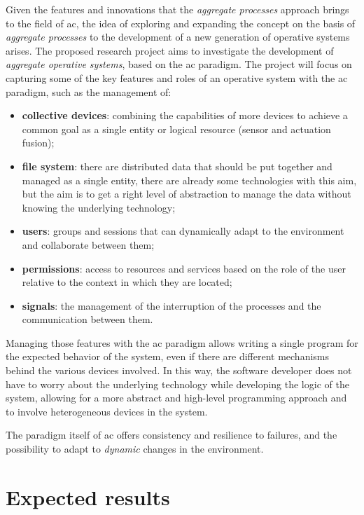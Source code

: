 \documentclass[12pt, a4paper]{article}
\begin{document}
Given the features and innovations that the \emph{aggregate processes} approach brings to the field of \ac{ac},
the idea of exploring and expanding the concept on the basis of \emph{aggregate processes} to the development
of a new generation of operative systems arises.
%
The proposed research project aims to investigate the development of \emph{aggregate operative systems},
based on the \ac{ac} paradigm.
%
The project will focus on capturing some of the key features and roles of an operative system with the \ac{ac} paradigm,
such as the management of:
\begin{itemize}
    \item \textbf{collective devices}: combining the capabilities of more devices to achieve a common goal as a single
        entity or logical resource (sensor and actuation fusion);
    \item \textbf{file system}: there are distributed data that should be put together and managed as a single entity,
        there are already some technologies with this aim, but the aim is to get a right level of abstraction to manage the data
        without knowing the underlying technology;
    \item \textbf{users}: groups and sessions that can dynamically adapt to the environment and collaborate between them;
    \item \textbf{permissions}: access to resources and services based on the role of the user relative to the context in which they are located;
    \item \textbf{signals}: the management of the interruption of the processes and the communication between them.
\end{itemize}

Managing those features with the \ac{ac} paradigm allows writing a single program for the expected behavior of the system,
even if there are different mechanisms behind the various devices involved.
%
In this way,
the software developer does not have to worry about the underlying technology while developing the logic of the system,
allowing for a more abstract and high-level programming approach and to involve heterogeneous devices in the system.

The paradigm itself of \ac{ac} offers consistency and resilience to failures,
and the possibility to adapt to \emph{dynamic} changes in the environment.

\section{Expected results}\label{sec:expected-results}
\end{document}
